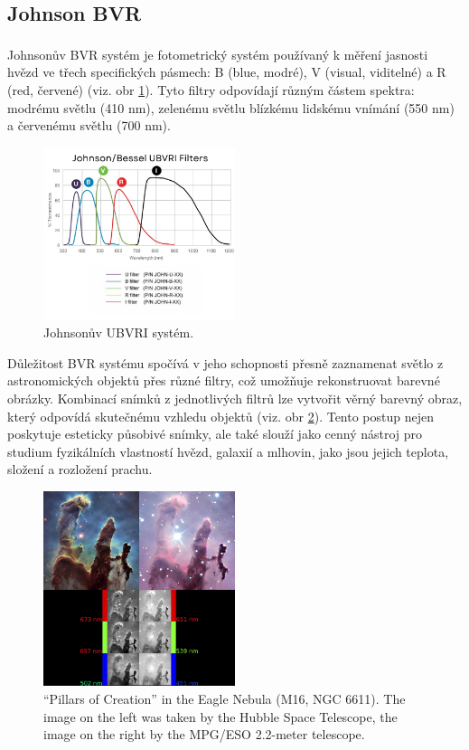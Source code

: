 \documentclass[a4paper,11pt,twocolumn]{article}
\begin{document}
        \subsection{Johnson BVR}
            Johnsonův BVR\textsuperscript{\cite{1953ApJ...117..313J}}  systém je fotometrický systém používaný k měření jasnosti hvězd ve třech specifických pásmech: B (blue, modré), V (visual, viditelné) a R (red, červené) (viz. obr \ref{fig:john}). Tyto filtry odpovídají různým částem spektra: modrému světlu (410 nm), zelenému světlu blízkému lidskému vnímání (550 nm) a červenému světlu (700 nm).

            \begin{figure}
                \centering
                \includegraphics[width=0.5\textwidth]{john}
                \caption{Johnsonův UBVRI systém.}
                \label{fig:john}
            \end{figure}

            Důležitost BVR systému spočívá v jeho schopnosti přesně zaznamenat světlo z astronomických objektů přes různé filtry, což umožňuje rekonstruovat barevné obrázky. Kombinací snímků z jednotlivých filtrů lze vytvořit věrný barevný obraz, který odpovídá skutečnému vzhledu objektů (viz. obr \ref{fig:rgb}). Tento postup nejen poskytuje esteticky působivé snímky, ale také slouží jako cenný nástroj pro studium fyzikálních vlastností hvězd, galaxií a mlhovin, jako jsou jejich teplota, složení a rozložení prachu.

            \begin{figure}
                \centering
                \includegraphics[width=0.5\textwidth]{rgb}
                \caption{“Pillars of Creation” in the Eagle Nebula (M16, NGC 6611). The image on the left was taken by the Hubble Space Telescope, the image on the right by the MPG/ESO 2.2-meter telescope. }
                \label{fig:rgb}
            \end{figure}
\end{document}
